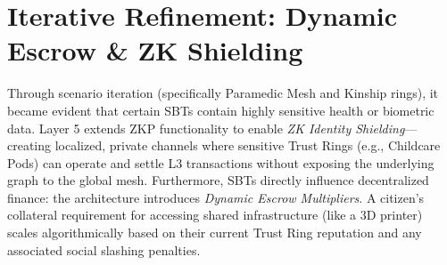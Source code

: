 \section{Iterative Refinement: Dynamic Escrow \& ZK Shielding}
Through scenario iteration (specifically Paramedic Mesh and Kinship rings), it became evident that certain SBTs contain highly sensitive health or biometric data. Layer 5 extends ZKP functionality to enable \textit{ZK Identity Shielding}—creating localized, private channels where sensitive Trust Rings (e.g., Childcare Pods) can operate and settle L3 transactions without exposing the underlying graph to the global mesh. Furthermore, SBTs directly influence decentralized finance: the architecture introduces \textit{Dynamic Escrow Multipliers}. A citizen's collateral requirement for accessing shared infrastructure (like a 3D printer) scales algorithmically based on their current Trust Ring reputation and any associated social slashing penalties.
